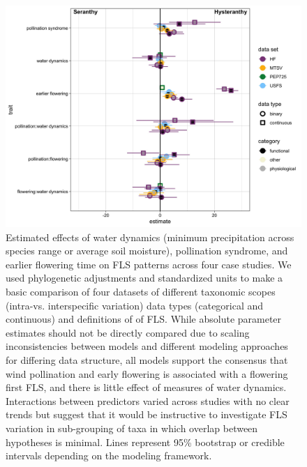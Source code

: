 \documentclass[12pt]{article}
\begin{document}
        \begin{figure}[ht]
    \centering
    \includegraphics[width=\textwidth]{..//figure/allmods_effectsizes_combined.jpeg}
    \caption{Estimated effects of water dynamics (minimum precipitation across species range or average soil moisture), pollination syndrome, and earlier flowering time on FLS patterns across four case studies. We used phylogenetic adjustments and standardized units to make a basic comparison of four datasets of different taxonomic scopes (intra-vs. interspecific variation) data types (categorical and continuous) and definitions of of FLS. While absolute parameter estimates should not be directly compared due to scaling inconsistencies between models and different modeling approaches for differing data structure, all models support the consensus that wind pollination and early flowering is associated with a flowering first FLS, and there is little effect of measures of water dynamics. Interactions between predictors varied across studies with no clear trends but suggest that it would be instructive to investigate FLS variation in sub-grouping of taxa in which overlap between hypotheses is minimal. Lines represent 95\% bootstrap or credible intervals depending on the modeling framework.}
    \label{fig:Figure 4}
    \end{figure}




\end{document}
